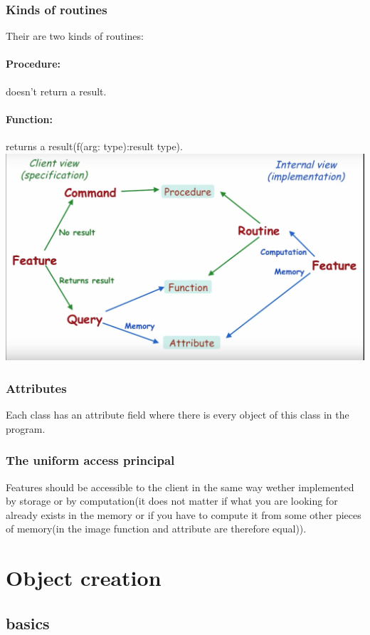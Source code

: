 \documentclass[11pt]{article}
\newcommand\back[1][-3cm]{\hspace*{#1}}
\begin{document}
\subsubsection{Kinds of routines}
Their are two kinds of routines:\paragraph{Procedure:} doesn't return a result.\paragraph{Function:} returns a result(f(arg: type):result type).\\
\back\includegraphics[scale = 0.5]{feature}
\subsubsection{Attributes}
Each class has an attribute field where there is every object of this class in the program.
\subsubsection{The uniform access principal}
Features should be accessible to the client in the same way wether implemented by storage or by computation(it does not matter if what you are looking for already exists in the memory or if you have to compute it from some other pieces of memory(in the image function and attribute are therefore equal)). 
\section{Object creation}
\subsection{basics}
\end{document}
